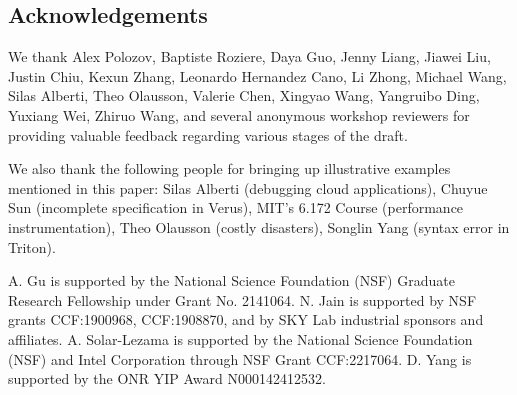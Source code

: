 \subsection{Acknowledgements}

We thank Alex Polozov, Baptiste Roziere, Daya Guo, Jenny Liang, Jiawei Liu, Justin Chiu, Kexun Zhang, Leonardo Hernandez Cano, Li Zhong, Michael Wang, Silas Alberti, Theo Olausson, Valerie Chen, Xingyao Wang, Yangruibo Ding, Yuxiang Wei, Zhiruo Wang, and several anonymous workshop reviewers for providing valuable feedback regarding various stages of the draft.

We also thank the following people for bringing up illustrative examples mentioned in this paper: Silas Alberti (debugging cloud applications), Chuyue Sun (incomplete specification in Verus), MIT's 6.172 Course (performance instrumentation), Theo Olausson (costly disasters), Songlin Yang (syntax error in Triton).

A. Gu is supported by the National Science Foundation (NSF) Graduate Research Fellowship under Grant No. 2141064. 
N. Jain is supported by NSF grants CCF:1900968, CCF:1908870, and by SKY Lab industrial sponsors and affiliates. 
A. Solar-Lezama is supported by the National Science Foundation (NSF) and Intel Corporation through NSF Grant CCF:2217064.
D. Yang is supported by the ONR YIP Award N000142412532. 